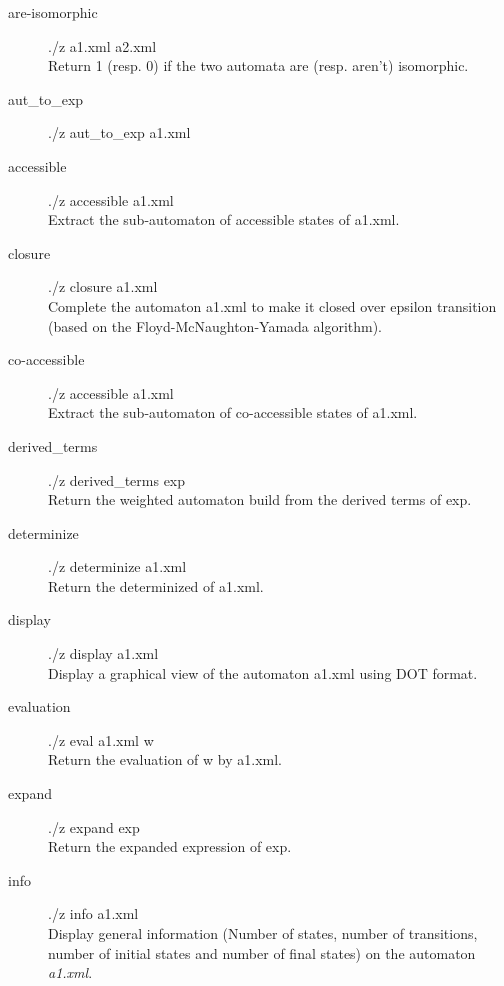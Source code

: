 \begin{description}
  \item [are-isomorphic]
    ./z a1.xml a2.xml\\
    Return 1 (resp. 0) if the two automata are (resp. aren't)
    isomorphic.

  \item [aut\_to\_exp]
    ./z aut\_to\_exp a1.xml\\

  \item [accessible]
    ./z accessible a1.xml\\
    Extract the sub-automaton of accessible states of a1.xml.

  \item [closure]
    ./z closure a1.xml\\
    Complete the automaton a1.xml to make it
    closed over epsilon transition (based on the
    Floyd-McNaughton-Yamada algorithm).

  \item [co-accessible]
    ./z accessible a1.xml\\
    Extract the sub-automaton of co-accessible states of a1.xml.

  \item [derived\_terms]
    ./z derived\_terms exp\\
    Return the weighted automaton build from the derived terms of exp.

  \item [determinize]
    ./z determinize a1.xml\\
    Return the determinized of a1.xml.

  \item [display]
    ./z display a1.xml\\
    Display a graphical view of the automaton a1.xml using DOT format.

  \item [evaluation]
    ./z eval a1.xml w\\
    Return the evaluation of w by a1.xml.

  \item [expand]
    ./z expand exp\\
    Return the expanded expression of exp.

  \item [info]
    ./z info a1.xml\\
    Display general information (Number of states, number of
    transitions, number of initial states and number of final
    states) on the automaton \textit{a1.xml}.


\end{description}
